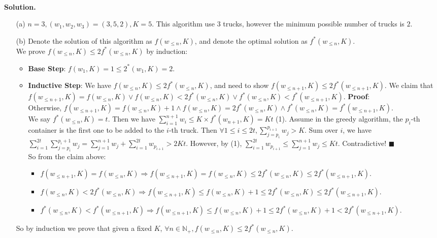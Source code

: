 \documentclass{article}
\begin{document}
\begin{enumerate}
~\\
\textbf{Solution.}
\begin{spacing}{1.5}
\begin{itemize}
    \item [(a)]  $n=3, (w_1,w_2,w_3) = (3, 5, 2), K = 5$. This algorithm use $3$ trucks, however the minimum possible number of trucks is $2$.
    \item [(b)] Denote the solution of this algorithm as $f(w_{\leq n}, K)$, and denote the optimal solution as $f^*(w_{\leq n}, K)$.\\
        We prove $f(w_{\leq n}, K)\leq 2f^*(w_{\leq n}, K)$ by induction: 
        \begin{itemize}
            \item \textbf{Base Step}: $f(w_1, K)=1\leq 2^*(w_1,K)=2$.
            \item \textbf{Inductive Step}: We have $f(w_{\leq n},K)\leq 2f^*(w_{\leq n},K)$, and need to show $f(w_{\leq n+1}, K)\leq 2f^*(w_{\leq n + 1}, K)$. We claim that $f(w_{\leq n+1}, K)=f(w_{\leq n}, K) \vee f(w_{\leq n}, K)<2f^*(w_{\leq n}, K) \vee f^*(w_{\leq n}, K)< f^*(w_{\leq n+1}, K)$. \textbf{Proof}:\\Otherwise, $f(w_{\leq n+1}, K) = f(w_{\leq n}, K) + 1 \wedge f(w_{\leq n}, K) = 2f^*(w_{\leq n},K) \wedge f^*(w_{\leq n}, K) = f^*(w_{\leq n+1}, K)$.\\
                We say $f^*(w_{\leq n},K)=t$. Then we have $\sum_{i=1}^{n+1} w_i \leq K\times f^*(w_{n+1}, K)= Kt$ (1). Assume in the greedy algorithm, the $p_i$-th container is the first one to be added to the $i$-th truck. Then $\forall 1\leq i\leq 2t, \sum_{j=p_i}^{p_{i+1}} w_j > K$. Sum over $i$, we have $\sum_{i=1}^{2t}\sum_{j=p_i}^{p_i+1}w_j=\sum_{j=1}^{n+1}w_j+\sum_{i=1}^{2t} w_{p_{i+1}} > 2Kt$. However, by (1), $\sum_{i=1}^{2t} w_{p_{i+1}}\leq \sum_{j=1}^{n+1}w_j\leq Kt$. Contradictive! $\blacksquare$
                \\So from the claim above: 
                \begin{itemize}
                    \item $f(w_{\leq n+1},K)=f(w_{\leq n},K) \Rightarrow f(w_{\leq n+1},K)=f(w_{\leq n},K)\leq 2f^*(w_{\leq n},K) \leq 2f^*(w_{\leq n+1},K)$.
                    \item $f(w_{\leq n},K)<2f^*(w_{\leq n},K) \Rightarrow f(w_{\leq n+1},K)\leq f(w_{\leq n},K)+1\leq 2f^*(w_{\leq n},K)\leq 2f^*(w_{\leq n+1},K)$.
                    \item $f^*(w_{\leq n},K)<f^*(w_{\leq n+1},K) \Rightarrow f(w_{\leq n+1},K)\leq f(w_{\leq n},K)+1\leq 2f^*(w_{\leq n},K)+1 < 2f^*(w_{\leq n+1},K)$.
                \end{itemize}
        \end{itemize}
        So by induction we prove that given a fixed $K$, $\forall n\in \mathbb{N}_+, f(w_{\leq n},K)\leq 2f^*(w_{\leq n},K)$.
\end{itemize}
\end{spacing}
~\\
~\\
~\\


\end{enumerate}
\end{document}
